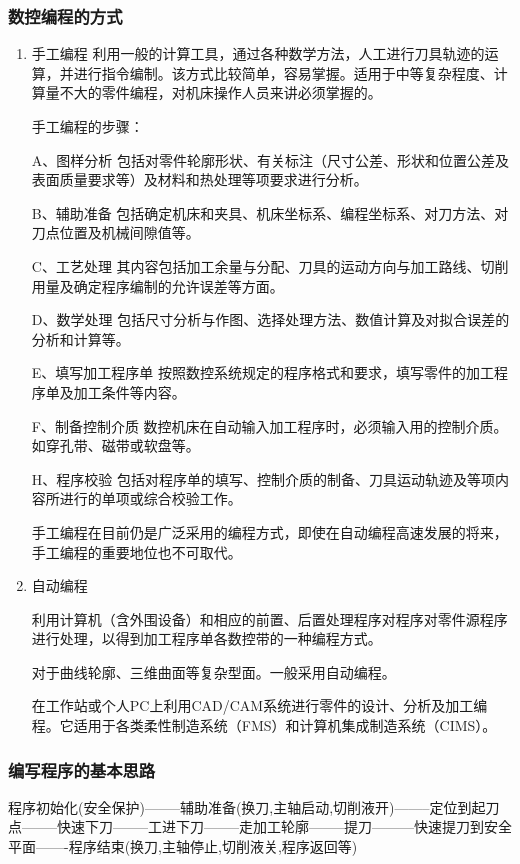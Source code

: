 \subsubsection{数控编程的方式}
\begin{enumerate}[1、]
\item 手工编程
利用一般的计算工具，通过各种数学方法，人工进行刀具轨迹的运算，并进行指令编制。该方式比较简单，容易掌握。适用于中等复杂程度、计算量不大的零件编程，对机床操作人员来讲必须掌握的。

手工编程的步骤：

A、图样分析  包括对零件轮廓形状、有关标注（尺寸公差、形状和位置公差及表面质量要求等）及材料和热处理等项要求进行分析。

B、辅助准备  包括确定机床和夹具、机床坐标系、编程坐标系、对刀方法、对刀点位置及机械间隙值等。

C、工艺处理  其内容包括加工余量与分配、刀具的运动方向与加工路线、切削用量及确定程序编制的允许误差等方面。

D、数学处理  包括尺寸分析与作图、选择处理方法、数值计算及对拟合误差的分析和计算等。

E、填写加工程序单  按照数控系统规定的程序格式和要求，填写零件的加工程序单及加工条件等内容。

F、制备控制介质  数控机床在自动输入加工程序时，必须输入用的控制介质。如穿孔带、磁带或软盘等。

H、程序校验  包括对程序单的填写、控制介质的制备、刀具运动轨迹及等项内容所进行的单项或综合校验工作。

手工编程在目前仍是广泛采用的编程方式，即使在自动编程高速发展的将来，手工编程的重要地位也不可取代。

\item 自动编程  

利用计算机（含外围设备）和相应的前置、后置处理程序对程序对零件源程序进行处理，以得到加工程序单各数控带的一种编程方式。

对于曲线轮廓、三维曲面等复杂型面。一般采用自动编程。

在工作站或个人PC上利用CAD/CAM系统进行零件的设计、分析及加工编程。它适用于各类柔性制造系统（FMS）和计算机集成制造系统（CIMS）。

\end{enumerate}
\subsubsection{编写程序的基本思路}
程序初始化(安全保护)--------辅助准备(换刀,主轴启动,切削液开)--------定位到起刀点--------快速下刀--------工进下刀--------走加工轮廓--------提刀---------快速提刀到安全平面-------程序结束(换刀,主轴停止,切削液关,程序返回等)
